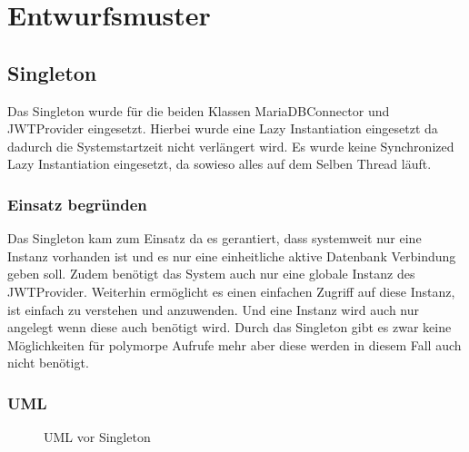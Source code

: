 \chapter{Entwurfsmuster}

\section{Singleton}

Das Singleton wurde für die beiden Klassen MariaDBConnector und JWTProvider eingesetzt.
Hierbei wurde eine Lazy Instantiation eingesetzt da dadurch die Systemstartzeit nicht verlängert wird.
Es wurde keine Synchronized Lazy Instantiation eingesetzt, da sowieso alles auf dem Selben Thread läuft.

\subsection{Einsatz begründen}

Das Singleton kam zum Einsatz da es gerantiert,
dass systemweit nur eine Instanz vorhanden ist und es nur eine einheitliche aktive Datenbank Verbindung geben soll.
Zudem benötigt das System auch nur eine globale Instanz des JWTProvider.
Weiterhin ermöglicht es einen einfachen Zugriff auf diese Instanz, ist einfach zu verstehen und anzuwenden.
Und eine Instanz wird auch nur angelegt wenn diese auch benötigt wird.
Durch das Singleton gibt es zwar keine Möglichkeiten für polymorpe Aufrufe mehr aber diese werden in diesem Fall auch nicht benötigt.


\subsection{UML}


\begin{figure}[htbp]
    \centering
    \caption{\label{1} UML vor Singleton}
\end{figure}

